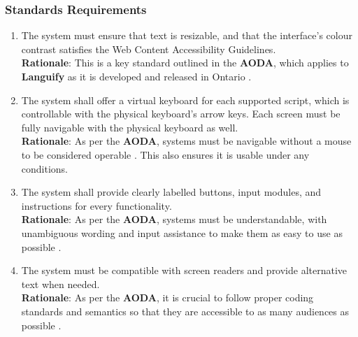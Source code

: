 \subsubsection{Standards Requirements}
\label{ssub:standards_requirements}
\begin{enumerate}[{LR-STD}1. ]
	\item The system must ensure that text is resizable, and that the interface’s colour contrast satisfies the Web Content Accessibility Guidelines.
	\\ \textbf{Rationale}: This is a key standard outlined in the \textbf{AODA}, which applies to \textbf{Languify} as it is developed and released in Ontario \cite{Speedtest2025}.
	\item The system shall offer a virtual keyboard for each supported script, which is controllable with the physical keyboard’s arrow keys. Each screen must be fully navigable with the physical keyboard as well.
	\\ \textbf{Rationale}: As per the \textbf{AODA}, systems must be navigable without a mouse to be considered operable \cite{Speedtest2025}. This also ensures it is usable under any conditions.
	\item The system shall provide clearly labelled buttons, input modules, and instructions for every functionality.
	\\ \textbf{Rationale}: As per the \textbf{AODA}, systems must be understandable, with unambiguous wording and input assistance to make them as easy to use as possible \cite{AODA2025}.
	\item The system must be compatible with screen readers and provide alternative text when needed.
	\\ \textbf{Rationale}: As per the \textbf{AODA}, it is crucial to follow proper coding standards and semantics so that they are accessible to as many audiences as possible \cite{AODA2025}.
\end{enumerate}


